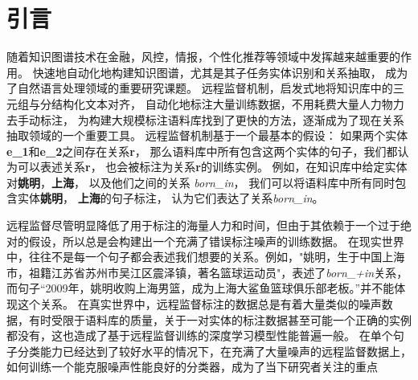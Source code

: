 \documentclass[UTF8]{csoarticle}
\begin{document}




\maketitle



\section{引言}
随着知识图谱技术在金融，风控，情报，个性化推荐等领域中发挥越来越重要的作用。
快速地自动化地构建知识图谱，尤其是其子任务实体识别和关系抽取，
成为了自然语言处理领域的重要研究课题。
远程监督机制，启发式地将知识库中的三元组与分结构化文本对齐，
自动化地标注大量训练数据，不用耗费大量人力物力去手动标注，
为构建大规模标注语料库找到了更快的方法，逐渐成为了现在关系抽取领域的一个重要工具。
远程监督机制基于一个最基本的假设：
如果两个实体\textbf{e\_1}和\textbf{e\_2}之间存在关系\textbf{r}，
那么语料库中所有包含这两个实体的句子，我们都认为可以表述关系\textbf{r}，
也会被标注为关系\textbf{r}的训练实例。
例如，在知识库中给定实体对\textbf{姚明}，\textbf{上海}，
以及他们之间的关系 \textit{born\_in}，
我们可以将语料库中所有同时包含实体\textbf{姚明}， \textbf{上海}的句子标注，
认为它们表达了关系\textit{born\_in}。

远程监督尽管明显降低了用于标注的海量人力和时间，但由于其依赖于一个过于绝对的假设，所以总是会构建出一个充满了错误标注噪声的训练数据。
在现实世界中，往往不是每一个句子都会表述我们想要的关系。例如，"姚明，生于中国上海市，祖籍江苏省苏州市吴江区震泽镇，著名篮球运动员"，表述了\textit{born\_+in}关系，
而句子“2009年，姚明收购上海男篮，成为上海大鲨鱼篮球俱乐部老板。”并不能体现这个关系。
在真实世界中，远程监督标注的数据总是有着大量类似的噪声数据，有时受限于语料库的质量，关于一对实体的标注数据甚至可能一个正确的实例都没有，这也造成了基于远程监督训练的深度学习模型性能普遍一般。
在单个句子分类能力已经达到了较好水平的情况下，在充满了大量噪声的远程监督数据上，如何训练一个能克服噪声性能良好的分类器，成为了当下研究者关注的重点
\end{document}
